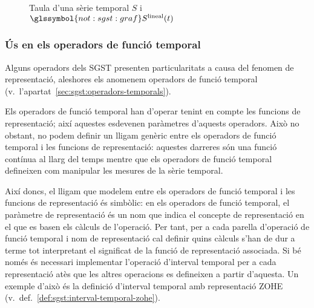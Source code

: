 \begin{example}
\begin{figure}[tp]
   \caption{Taula d'una sèrie temporal $S$ i
     $\glssymbol{not:sgst:graf} S^\text{lineal}(t)$}
  \label{fig:model:repr:lineal}
  \end{figure}

\end{example}


\subsubsection{Ús en els operadors de funció temporal}

Alguns operadors dels SGST presenten particularitats a causa del
fenomen de representació, aleshores els anomenem operadors de funció
temporal (v.\ l'apartat~\ref{sec:sgst:operadors-temporals}).

Els operadors de funció temporal han d'operar tenint en compte les
funcions de representació; així aquestes esdevenen paràmetres
d'aquests operadors. Això no obstant, no podem definir un lligam
genèric entre els operadors de funció temporal i les funcions de
representació: aquestes darreres són una funció contínua al llarg del
temps mentre que els operadors de funció temporal defineixen com
manipular les mesures de la sèrie temporal.

Així doncs, el lligam que modelem entre els operadors de funció
temporal i les funcions de representació és simbòlic: en els operadors
de funció temporal, el paràmetre de representació és un nom que indica
el concepte de representació en el que es basen els càlculs de
l'operació. Per tant, per a cada parella d'operació de funció temporal
i nom de representació cal definir quins càlculs s'han de dur a terme
tot interpretant el significat de la funció de representació
associada. Si bé només és necessari implementar l'operació d'interval
temporal per a cada representació atès que les altres operacions es
defineixen a partir d'aquesta. Un exemple d'això és la definició
d'interval temporal amb representació ZOHE (v.\
def.~\ref{def:sgst:interval-temporal-zohe}).

